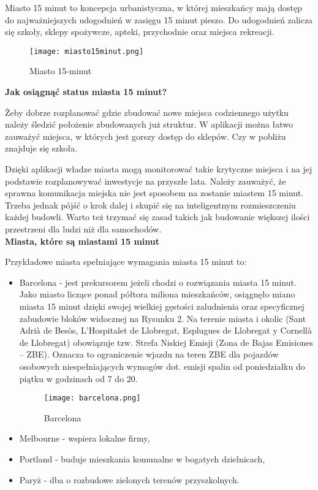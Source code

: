 \documentclass{article}
\begin{document}
Miasto 15 minut to koncepcja urbanistyczna, w której mieszkańcy mają dostęp do najważniejszych udogodnień w zasięgu 15 minut pieszo. Do udogodnień zalicza się szkoły, sklepy spożywcze, apteki, przychodnie oraz miejsca rekreacji.

\begin{figure}[H]
    \centering
    \texttt{[image: miasto15minut.png]}
    \caption{Miasto 15-minut \cite{miasto15minut}}
    \label{fig:enter-label}
\end{figure}

\noindent
\textbf{Jak osiągnąć status miasta 15 minut?}

Żeby dobrze rozplanować gdzie zbudować nowe miejsca codziennego użytku należy śledzić położenie zbudowanych już struktur. W aplikacji można łatwo zauważyć miejsca, w których jest gorszy dostęp do sklepów. Czy w pobliżu znajduje się szkoła.  

Dzięki aplikacji władze miasta mogą monitorować takie krytyczne miejsca i na jej podstawie rozplanowywać inwestycje na przyszłe lata. Należy zauważyć, że sprawna komunikacja miejska nie jest sposobem na zostanie miastem 15 minut. Trzeba jednak pójść o krok dalej i skupić się na inteligentnym rozmieszczeniu każdej budowli. Warto też trzymać się zasad takich jak budowanie większej ilości przestrzeni dla ludzi niż dla samochodów.
\\

\noindent
\textbf{Miasta, które są miastami 15 minut}

Przykładowe miasta spełniające wymagania miasta 15 minut to:
\begin{itemize}
    \item Barcelona - jest prekursorem jeżeli chodzi o rozwiązania miasta 15 minut. Jako miasto liczące ponad półtora miliona mieszkańców, osiągnęło miano miasta 15 minut dzięki swojej wielkiej gęstości zaludnienia oraz specyficznej zabudowie bloków widocznej na Rysunku 2. Na terenie miasta i okolic (Sant Adrià de Besòs, L’Hospitalet de Llobregat, Esplugues de Llobregat y Cornellà de Llobregat) obowiązuje tzw. Strefa Niskiej Emisji (Zona de Bajas Emisiones – ZBE). Oznacza to ograniczenie wjazdu na teren ZBE dla pojazdów osobowych niespełniających wymogów dot. emisji spalin od poniedziałku do piątku w godzinach od 7 do 20. \cite{gov}
    \begin{figure}[H]
        \centering
        \texttt{[image: barcelona.png]}
        \caption{Barcelona \cite{barcelona}}
        \label{fig:enter-label}
    \end{figure}
    \item Melbourne - wspiera lokalne firmy,
    \item Portland - buduje mieszkania komunalne w bogatych dzielnicach,
    \item Paryż - dba o rozbudowe zielonych terenów przyszkolnych.
\end{itemize}
\\
\end{document}
